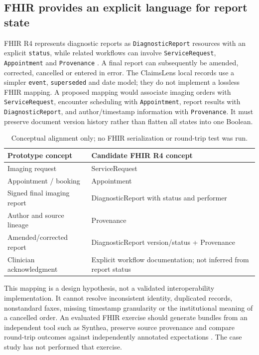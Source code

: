 \documentclass[11pt,twocolumn]{article}
\newcommand{\code}[1]{\texttt{#1}}
\begin{document}
\subsection{FHIR provides an explicit language for report state}
FHIR R4 represents diagnostic reports as \code{DiagnosticReport} resources with an explicit \code{status}, while related workflows can involve \code{ServiceRequest}, \code{Appointment} and \code{Provenance} \cite{fhirr4}. A final report can subsequently be amended, corrected, cancelled or entered in error. The ClaimsLens local records use a simpler \code{event}, \code{superseded} and date model; they do not implement a lossless FHIR mapping. A proposed mapping would associate imaging orders with \code{ServiceRequest}, encounter scheduling with \code{Appointment}, report results with \code{DiagnosticReport}, and author/timestamp information with \code{Provenance}. It must preserve document version history rather than flatten all states into one Boolean.

\begin{table}[ht]\centering\small\caption{Conceptual alignment only; no FHIR serialization or round-trip test was run.}\label{tab:fhir}
\begin{tabular}{@{}p{}p{}@{}}\toprule
Prototype concept & Candidate FHIR R4 concept \\\midrule
Imaging request & ServiceRequest \\
Appointment / booking & Appointment \\
Signed final imaging report & DiagnosticReport with status and performer \\
Author and source lineage & Provenance \\
Amended/corrected report & DiagnosticReport version/status + Provenance \\
Clinician acknowledgment & Explicit workflow documentation; not inferred from report status \\\bottomrule
\end{tabular}
\end{table}

This mapping is a design hypothesis, not a validated interoperability implementation. It cannot resolve inconsistent identity, duplicated records, nonstandard faxes, missing timestamp granularity or the institutional meaning of a cancelled order. An evaluated FHIR exercise should generate bundles from an independent tool such as Synthea, preserve source provenance and compare round-trip outcomes against independently annotated expectations \cite{synthea2018}. The case study has not performed that exercise.
\end{document}
